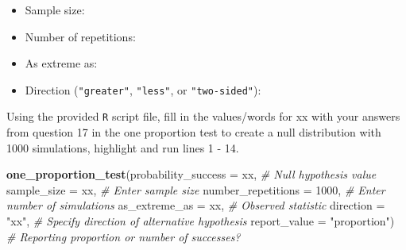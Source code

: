 \documentclass[
]{report}
\newenvironment{Shaded}{\begin{snugshade}}{\end{snugshade}}
\newcommand{\CommentTok}[1]{\textcolor[rgb]{0.56,0.35,0.01}{\textit{#1}}}
\newcommand{\DataTypeTok}[1]{\textcolor[rgb]{0.13,0.29,0.53}{#1}}
\newcommand{\DecValTok}[1]{\textcolor[rgb]{0.00,0.00,0.81}{#1}}
\newcommand{\KeywordTok}[1]{\textcolor[rgb]{0.13,0.29,0.53}{\textbf{#1}}}
\newcommand{\NormalTok}[1]{#1}
\newcommand{\StringTok}[1]{\textcolor[rgb]{0.31,0.60,0.02}{#1}}
\providecommand{\tightlist}{%
  \setlength{\itemsep}{0pt}\setlength{\parskip}{0pt}}
\begin{document}
\begin{itemize}
\tightlist
\item
  Sample size:
\end{itemize}

\vspace{.2in}

\begin{itemize}
\tightlist
\item
  Number of repetitions:
\end{itemize}

\vspace{.2in}

\begin{itemize}
\tightlist
\item
  As extreme as:
\end{itemize}

\vspace{.2in}

\begin{itemize}
\tightlist
\item
  Direction (\texttt{"greater"}, \texttt{"less"}, or \texttt{"two-sided"}):
\end{itemize}

\vspace{.2in}

Using the provided \texttt{R} script file, fill in the values/words for xx with your answers from question 17 in the one proportion test to create a null distribution with 1000 simulations, highlight and run lines 1 - 14.

\begin{Shaded}
\begin{Highlighting}[]
\KeywordTok{one\_proportion\_test}\NormalTok{(}\DataTypeTok{probability\_success =}\NormalTok{ xx, }\CommentTok{\# Null hypothesis value}
                    \DataTypeTok{sample\_size =}\NormalTok{ xx, }\CommentTok{\# Enter sample size}
                    \DataTypeTok{number\_repetitions =} \DecValTok{1000}\NormalTok{, }\CommentTok{\# Enter number of simulations}
                    \DataTypeTok{as\_extreme\_as =}\NormalTok{ xx, }\CommentTok{\# Observed statistic}
                    \DataTypeTok{direction =} \StringTok{"xx"}\NormalTok{, }\CommentTok{\# Specify direction of alternative hypothesis}
                    \DataTypeTok{report\_value =} \StringTok{"proportion"}\NormalTok{) }\CommentTok{\# Reporting proportion or number of successes?}
\end{Highlighting}
\end{Shaded}
\end{document}
